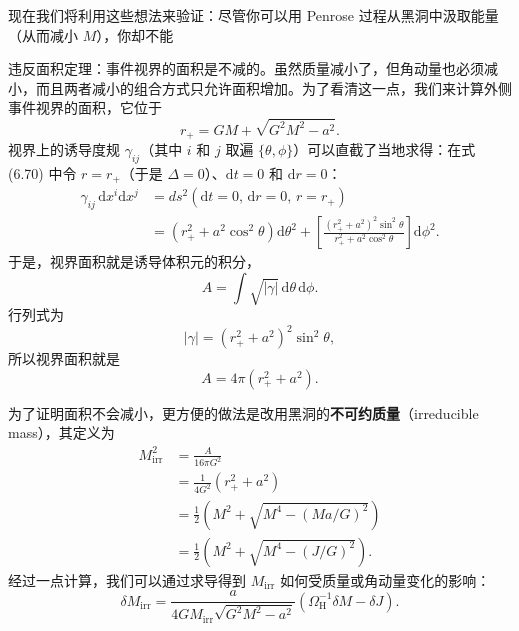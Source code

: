 现在我们将利用这些想法来验证：尽管你可以用 Penrose 过程从黑洞中汲取能量（从而减小 $M$），你却不能


违反面积定理：事件视界的面积是不减的。虽然质量减小了，但角动量也必须减小，而且两者减小的组合方式只允许面积增加。为了看清这一点，我们来计算外侧事件视界的面积，它位于
\begin{equation*}
r_{+} = GM + \sqrt{G^{2}M^{2}-a^{2}}.
\tag{6.105}
\end{equation*}
视界上的诱导度规 $\gamma_{ij}$（其中 $i$ 和 $j$ 取遍 $\{\theta,\phi\}$）可以直截了当地求得：在式 (6.70) 中令 $r=r_{+}$（于是 $\Delta=0$）、$\mathrm{d}t=0$ 和 $\mathrm{d}r=0$：
\begin{align*}
\gamma_{ij}\,\mathrm{d}x^{i}\mathrm{d}x^{j} &= ds^{2}(\mathrm{d}t=0,\,\mathrm{d}r=0,\,r=r_{+})\\
&= (r_{+}^{2}+a^{2}\cos^{2}\theta)\mathrm{d}\theta^{2} + \left[\frac{(r_{+}^{2}+a^{2})^{2}\sin^{2}\theta}{r_{+}^{2}+a^{2}\cos^{2}\theta}\right]\mathrm{d}\phi^{2}.
\tag{6.106}
\end{align*}
于是，视界面积就是诱导体积元的积分，
\begin{equation*}
A = \int\sqrt{|\gamma|}\,\mathrm{d}\theta\,\mathrm{d}\phi.
\tag{6.107}
\end{equation*}
行列式为
\begin{equation*}
|\gamma| = (r_{+}^{2}+a^{2})^{2}\sin^{2}\theta,
\tag{6.108}
\end{equation*}
所以视界面积就是
\begin{equation*}
A = 4\pi(r_{+}^{2}+a^{2}).
\tag{6.109}
\end{equation*}

为了证明面积不会减小，更方便的做法是改用黑洞的\textbf{不可约质量}（irreducible mass），其定义为
\begin{align*}
M_{\mathrm{irr}}^{2} &= \frac{A}{16\pi G^{2}}\\
&= \frac{1}{4G^{2}}(r_{+}^{2}+a^{2})\\
&= \frac{1}{2}\left(M^{2}+\sqrt{M^{4}-(Ma/G)^{2}}\right)\\
&= \frac{1}{2}\left(M^{2}+\sqrt{M^{4}-(J/G)^{2}}\right).
\tag{6.110}
\end{align*}
经过一点计算，我们可以通过求导得到 $M_{\mathrm{irr}}$ 如何受质量或角动量变化的影响：
\begin{equation*}
\delta M_{\mathrm{irr}} = \frac{a}{4GM_{\mathrm{irr}}\sqrt{G^{2}M^{2}-a^{2}}}\left(\Omega_{\mathrm{H}}^{-1}\delta M - \delta J\right).
\tag{6.111}
\end{equation*}

